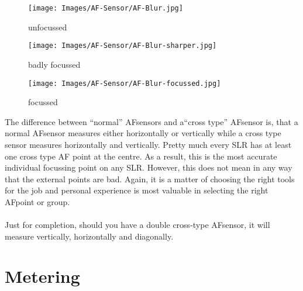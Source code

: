 \begin{figure}[htb]
\begin{minipage}{.32\textwidth}
	\centering
	\texttt{[image: Images/AF-Sensor/AF-Blur.jpg]}
	\caption{unfocussed}
	\label{fig:AF-Blur}
\end{minipage}
\begin{minipage}{.32\textwidth}
	\centering
	\texttt{[image: Images/AF-Sensor/AF-Blur-sharper.jpg]}
	\caption{badly focussed}
	\label{fig:AF-Blur-sharper}
\end{minipage}
\begin{minipage}{.32\textwidth}
	\centering
	\texttt{[image: Images/AF-Sensor/AF-Blur-focussed.jpg]}
	\caption{focussed}
	\label{fig:AF-Blur-focussed}
\end{minipage}
\end{figure}

The difference between ``normal'' \glspl{AFsensor} and  a``cross type'' \gls{AFsensor} is, that a normal \gls{AFsensor} measures either horizontally or vertically while a cross type sensor measures horizontally and vertically. Pretty much every \gls{SLR} has at least one cross type \gls{AF} point at the centre. As a result, this is the most accurate individual focussing point on any \gls{SLR}. However, this does not mean in any way that the external points are bad. Again, it is a matter of choosing the right tools for the job and personal experience is most valuable in selecting the right \gls{AFpoint} or group.
\\
\\
Just for completion, should you have a double cross-type \gls{AFsensor}, it will measure vertically, horizontally and diagonally.


\section{Metering}


